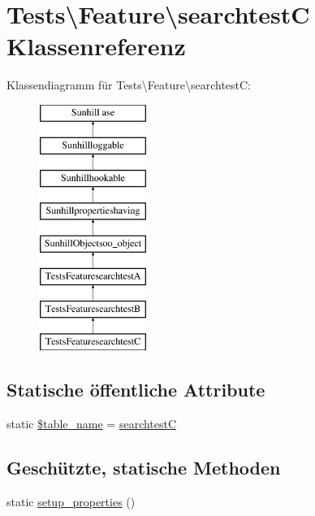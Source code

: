 \hypertarget{classTests_1_1Feature_1_1searchtestC}{}\section{Tests\textbackslash{}Feature\textbackslash{}searchtestC Klassenreferenz}
\label{classTests_1_1Feature_1_1searchtestC}
Klassendiagramm für Tests\textbackslash{}Feature\textbackslash{}searchtestC\+:\begin{figure}[H]
\begin{center}
\leavevmode
\includegraphics[height=8.000000cm]{dd/d21/classTests_1_1Feature_1_1searchtestC}
\end{center}
\end{figure}
\subsection*{Statische öffentliche Attribute}
\begin{DoxyCompactItemize}
\item 
static \hyperlink{classTests_1_1Feature_1_1searchtestC_a5109c83a9940817673d93badb8332ebc}{\$table\+\_\+name} = \textquotesingle{}\hyperlink{classTests_1_1Feature_1_1searchtestC}{searchtestC}\textquotesingle{}
\end{DoxyCompactItemize}
\subsection*{Geschützte, statische Methoden}
\begin{DoxyCompactItemize}
\item 
static \hyperlink{classTests_1_1Feature_1_1searchtestC_a89af95c4b5456e7f35d06118c84fb96b}{setup\+\_\+properties} ()
\end{DoxyCompactItemize}
